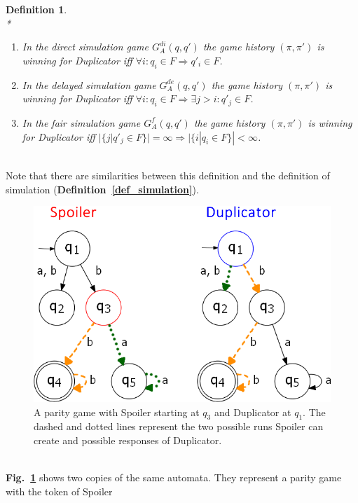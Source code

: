 \documentclass[12pt,oneside,bibliography=totoc,abstracton]{scrartcl}
\newcommand{\figref}[1]{\textbf{Fig.~\ref{#1}}}
\newcommand{\defref}[1]{\textbf{Definition~\ref{#1}}}
\newtheorem{mydef}{Definition}
\begin{document}
\begin{mydef}\label{def_gamewinning}\quad\\*
	\begin{enumerate}
		\item In the \textnormal{direct simulation game} $G^{di}_A(q, q')$ the game history $(\pi, \pi')$ is winning for Duplicator
			iff $\forall i : q_i \in F \Rightarrow q'_i \in F$.
		\item In the \textnormal{delayed simulation game} $G^{de}_A(q, q')$ the game history $(\pi, \pi')$ is winning for Duplicator
			iff $\forall i : q_i \in F \Rightarrow \exists j > i : q'_j \in F$.
		\item In the \textnormal{fair simulation game} $G^f_A(q, q')$ the game history $(\pi, \pi')$ is winning for Duplicator
			iff $|\{j | q'_j \in F\}| = \infty \Rightarrow |\{i | q_i \in F\}| < \infty$.
	\end{enumerate}
\end{mydef}\quad\\
Note that there are similarities between this definition and the definition of simulation (\defref{def_simulation}).\\
\begin{figure}[ht]
	 \begin{center}
		\includegraphics[scale=0.6]{res/paritygame}
	\end{center}
	\caption{A parity game with Spoiler starting at $q_3$ and Duplicator at $q_1$. The dashed and dotted lines represent
		the two possible runs Spoiler can create and possible responses of Duplicator.}
	\label{paritygame}
\end{figure}\quad\\
\figref{paritygame} shows two copies of the same automata. They represent a parity game with the token of Spoiler
\end{document}

